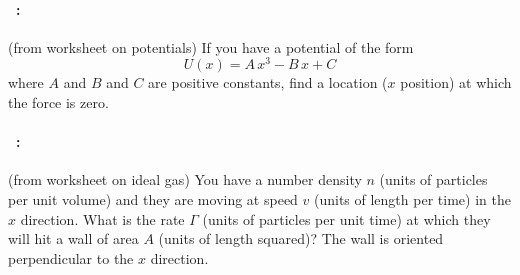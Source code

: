 \documentclass[12pt]{article} 
\begin{document}
\vfill

\paragraph{\problemname~\theproblem:}%
(from worksheet on potentials)
If you have a potential of the form
$$
U(x) = A\,x^3 - B\,x + C
$$ where $A$ and $B$ and $C$ are positive constants, find a location ($x$ position) at which
the force is zero.

\vfill

\paragraph{\problemname~\theproblem:}%
(from worksheet on ideal gas)
You have a number density $n$ (units of particles per unit volume)
and they are moving at speed $v$ (units of length per time)
in the $x$ direction.
What is the rate $\Gamma$ (units of particles per unit time) at which they
will hit a wall of area $A$ (units of length squared)?
The wall is oriented perpendicular to the $x$ direction.

\vfill
~
\end{document}
